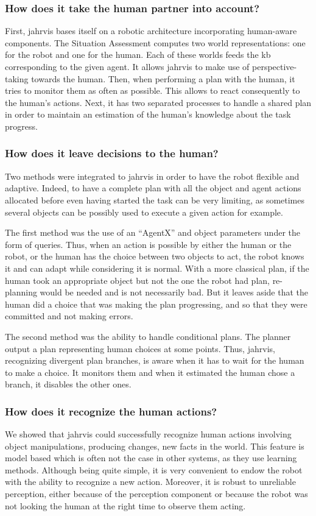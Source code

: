 \documentclass[a4paper,11pt,twoside]{StyleThese}
\begin{document}
\subsubsection*{How does it take the human partner into account?} First, \acrshort{jahrvis} bases itself on a robotic architecture incorporating human-aware components. The Situation Assessment computes two world representations: one for the robot and one for the human. Each of these worlds feeds the \acrlong{kb} corresponding to the given agent. It allows \acrshort{jahrvis} to make use of perspective-taking towards the human. Then, when performing a plan with the human, it tries to monitor them as often as possible. This allows to react consequently to the human's actions. Next, it has two separated processes to handle a shared plan in order to maintain an estimation of the human's knowledge about the task progress.

\subsubsection*{How does it leave decisions to the human?} Two methods were integrated to \acrshort{jahrvis} in order to have the robot flexible and adaptive. Indeed, to have a complete plan with all the object and agent actions allocated before even having started the task can be very limiting, as sometimes several objects can be possibly used to execute a given action for example. 

The first method was the use of an ``AgentX'' and object parameters under the form of \sparql{} queries. Thus, when an action is possible by either the human or the robot, or the human has the choice between two objects to act, the robot knows it and can adapt while considering it is normal. With a more classical plan, if the human took an appropriate object but not the one the robot had plan, re-planning would be needed and is not necessarily bad. But it leaves aside that the human did a choice that was making the plan progressing, and so that they were committed and not making errors.

The second method was the ability to handle conditional plans. The planner output a plan representing human choices at some points. Thus, \acrshort{jahrvis}, recognizing divergent plan branches, is aware when it has to wait for the human to make a choice. It monitors them and when it estimated the human chose a branch, it disables the other ones.

\subsubsection*{How does it recognize the human actions?} We showed that \acrshort{jahrvis} could successfully recognize human actions involving object manipulations, producing changes, new facts in the world. This feature is model based which is often not the case in other systems, as they use learning methods. Although being quite simple, it is very convenient to endow the robot with the ability to recognize a new action. Moreover, it is robust to unreliable perception, either because of the perception component or because the robot was not looking the human at the right time to observe them acting.
\end{document}
